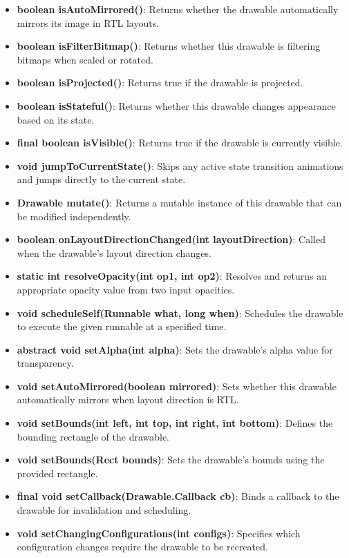 \documentclass{report}
\begin{document}
\begin{itemize}
\begin{itemize}
                \item \textbf{boolean isAutoMirrored()}: Returns whether the drawable automatically mirrors its image in RTL layouts.
                \item \textbf{boolean isFilterBitmap()}: Returns whether this drawable is filtering bitmaps when scaled or rotated.
                \item \textbf{boolean isProjected()}: Returns true if the drawable is projected.
                \item \textbf{boolean isStateful()}: Returns whether this drawable changes appearance based on its state.
                \item \textbf{final boolean isVisible()}: Returns true if the drawable is currently visible.
                \item \textbf{void jumpToCurrentState()}: Skips any active state transition animations and jumps directly to the current state.
                \item \textbf{Drawable mutate()}: Returns a mutable instance of this drawable that can be modified independently.
                \item \textbf{boolean onLayoutDirectionChanged(int layoutDirection)}: Called when the drawable’s layout direction changes.
                \item \textbf{static int resolveOpacity(int op1, int op2)}: Resolves and returns an appropriate opacity value from two input opacities.
                \item \textbf{void scheduleSelf(Runnable what, long when)}: Schedules the drawable to execute the given runnable at a specified time.
                \item \textbf{abstract void setAlpha(int alpha)}: Sets the drawable’s alpha value for transparency.
                \item \textbf{void setAutoMirrored(boolean mirrored)}: Sets whether this drawable automatically mirrors when layout direction is RTL.
                \item \textbf{void setBounds(int left, int top, int right, int bottom)}: Defines the bounding rectangle of the drawable.
                \item \textbf{void setBounds(Rect bounds)}: Sets the drawable’s bounds using the provided rectangle.
                \item \textbf{final void setCallback(Drawable.Callback cb)}: Binds a callback to the drawable for invalidation and scheduling.
                \item \textbf{void setChangingConfigurations(int configs)}: Specifies which configuration changes require the drawable to be recreated.

\end{itemize}
\end{itemize}
\end{document}
